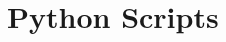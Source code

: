 \documentclass[3p,times,procedia]{elsarticle}
\begin{document}




\appendix
\section{Python Scripts}
\end{document}
